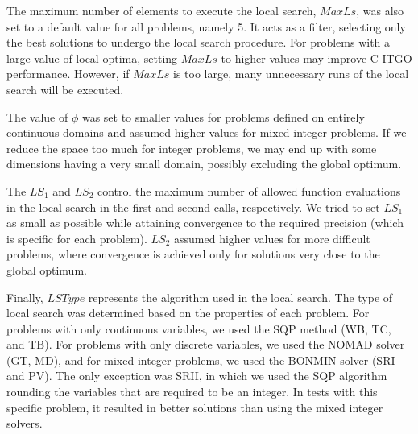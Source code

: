 The maximum number of elements to execute the local search, $MaxLs$, was also set to a default value for all problems, namely 5. It acts as a filter, selecting only the best solutions to undergo the local search procedure. For problems with a large value of local optima, setting $MaxLs$ to higher values may improve C-ITGO performance. However, if $MaxLs$ is too large, many unnecessary runs of the local search will be executed.


The value of $\phi$ was set to smaller values for problems defined on entirely continuous domains and assumed higher values for mixed integer problems. If we reduce the space too much for integer problems, we may end up with some dimensions having a very small domain, possibly excluding the global optimum.

The $LS_1$ and $LS_2$ control the maximum number of allowed function evaluations in the local search in the first and second calls, respectively. We tried to set $LS_1$ as small as possible while attaining convergence to the required precision (which is specific for each problem). $LS_2$ assumed higher values for more difficult problems, where convergence is achieved only for solutions very close to the global optimum.

Finally, $LSType$ represents the algorithm used in the local search. The type of local search was determined based on the properties of each problem. For problems with only continuous variables, we used the SQP method (WB, TC, and TB). For problems with only discrete variables, we used the NOMAD solver (GT, MD), and for mixed integer problems, we used the BONMIN solver (SRI and PV). The only exception was SRII, in which we used the SQP algorithm rounding the variables that are required to be an integer. In tests with this specific problem, it resulted in better solutions than using the mixed integer solvers.